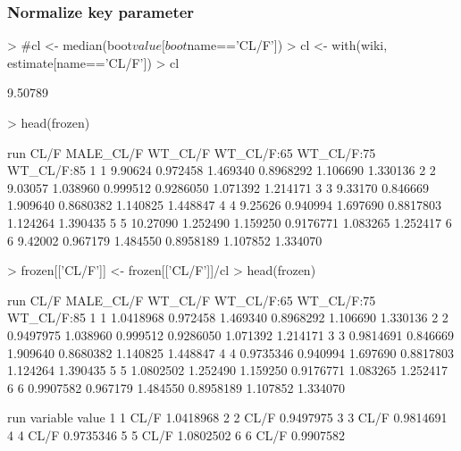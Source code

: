 \subsubsection{Normalize key parameter}
\begin{Schunk}
\begin{Sinput}
> #cl <- median(boot$value[boot$name=='CL/F'])
> cl <- with(wiki, estimate[name=='CL/F'])
> cl
\end{Sinput}
\begin{Soutput}
[1] 9.50789
\end{Soutput}
\begin{Sinput}
> head(frozen)
\end{Sinput}
\begin{Soutput}
  run     CL/F MALE_CL/F  WT_CL/F WT_CL/F:65 WT_CL/F:75 WT_CL/F:85
1   1  9.90624  0.972458 1.469340  0.8968292   1.106690   1.330136
2   2  9.03057  1.038960 0.999512  0.9286050   1.071392   1.214171
3   3  9.33170  0.846669 1.909640  0.8680382   1.140825   1.448847
4   4  9.25626  0.940994 1.697690  0.8817803   1.124264   1.390435
5   5 10.27090  1.252490 1.159250  0.9176771   1.083265   1.252417
6   6  9.42002  0.967179 1.484550  0.8958189   1.107852   1.334070
\end{Soutput}
\begin{Sinput}
> frozen[['CL/F']] <- frozen[['CL/F']]/cl
> head(frozen)
\end{Sinput}
\begin{Soutput}
  run      CL/F MALE_CL/F  WT_CL/F WT_CL/F:65 WT_CL/F:75 WT_CL/F:85
1   1 1.0418968  0.972458 1.469340  0.8968292   1.106690   1.330136
2   2 0.9497975  1.038960 0.999512  0.9286050   1.071392   1.214171
3   3 0.9814691  0.846669 1.909640  0.8680382   1.140825   1.448847
4   4 0.9735346  0.940994 1.697690  0.8817803   1.124264   1.390435
5   5 1.0802502  1.252490 1.159250  0.9176771   1.083265   1.252417
6   6 0.9907582  0.967179 1.484550  0.8958189   1.107852   1.334070
\end{Soutput}
\begin{Soutput}
  run variable     value
1   1     CL/F 1.0418968
2   2     CL/F 0.9497975
3   3     CL/F 0.9814691
4   4     CL/F 0.9735346
5   5     CL/F 1.0802502
6   6     CL/F 0.9907582
\end{Soutput}
\end{Schunk}
